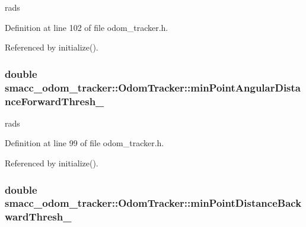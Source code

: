rads 



Definition at line 102 of file odom\+\_\+tracker.\+h.



Referenced by initialize().

\subsubsection[{\texorpdfstring{min\+Point\+Angular\+Distance\+Forward\+Thresh\+\_\+}{minPointAngularDistanceForwardThresh_}}]{\setlength{\rightskip}{0pt plus 5cm}double smacc\+\_\+odom\+\_\+tracker\+::\+Odom\+Tracker\+::min\+Point\+Angular\+Distance\+Forward\+Thresh\+\_\+\hspace{0.3cm}{\ttfamily [protected]}}\hypertarget{classsmacc__odom__tracker_1_1OdomTracker_a1611f6e11f48e8c2bdf6d16adf35fa2a}{}\label{classsmacc__odom__tracker_1_1OdomTracker_a1611f6e11f48e8c2bdf6d16adf35fa2a}


rads 



Definition at line 99 of file odom\+\_\+tracker.\+h.



Referenced by initialize().

\subsubsection[{\texorpdfstring{min\+Point\+Distance\+Backward\+Thresh\+\_\+}{minPointDistanceBackwardThresh_}}]{\setlength{\rightskip}{0pt plus 5cm}double smacc\+\_\+odom\+\_\+tracker\+::\+Odom\+Tracker\+::min\+Point\+Distance\+Backward\+Thresh\+\_\+\hspace{0.3cm}{\ttfamily [protected]}}\hypertarget{classsmacc__odom__tracker_1_1OdomTracker_a79d94520c5da1852602aaf264377a82f}{}\label{classsmacc__odom__tracker_1_1OdomTracker_a79d94520c5da1852602aaf264377a82f}


